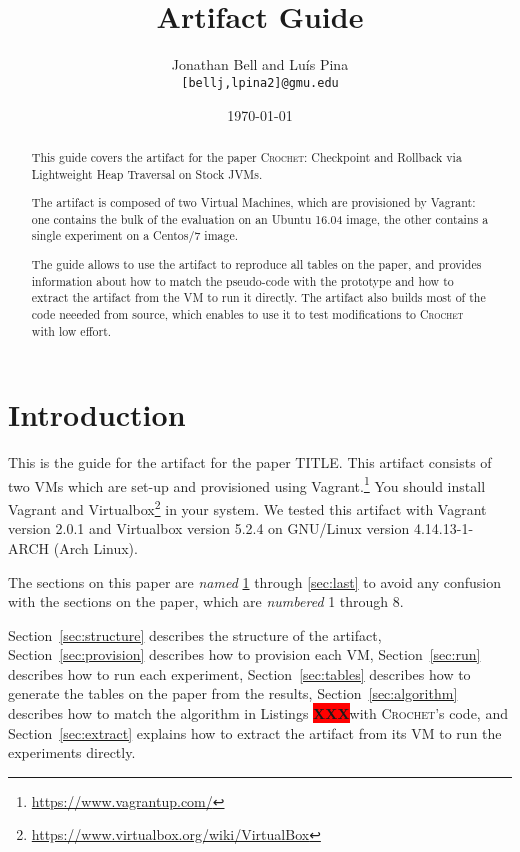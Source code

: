 \documentclass[12pt]{article}
\title{\emph{\papertitle} \\ Artifact Guide}
\author{Jonathan Bell and Lu\'{i}s Pina \\ \texttt{[bellj,lpina2]@gmu.edu}}
\affil{George Mason University}
\date{\today}
\newcommand{\XXX}{\colorbox{red}{\bf\color{white}XXX}}
\newcommand{\sysname}{\textsc{Crochet}\xspace}
\newcommand{\papertitle}{\sysname: Checkpoint and Rollback via Lightweight Heap Traversal on Stock JVMs\xspace}
\begin{document}
\maketitle

\begin{abstract}

    This guide covers the artifact for the paper \papertitle.

    The artifact is composed of two Virtual Machines, which are provisioned by
    Vagrant: one contains the bulk of the evaluation on an Ubuntu 16.04 image,
    the other contains a single experiment on a Centos/7 image.

    The guide allows to use the artifact to reproduce all tables on the paper,
    and provides information about how to match the pseudo-code with the
    prototype and how to extract the artifact from the VM to run it directly.
    The artifact also builds most of the code neeeded from source, which enables
    to use it to test modifications to \sysname with low effort.

\end{abstract}

\section{Introduction}
\label{sec:first}

This is the guide for the artifact for the paper TITLE.  This artifact consists
of two VMs which are set-up and provisioned using
Vagrant.\footnote{\url{https://www.vagrantup.com/}}  You should install Vagrant
and Virtualbox\footnote{\url{https://www.virtualbox.org/wiki/VirtualBox}} in
your system.  We tested this artifact with Vagrant version 2.0.1 and Virtualbox
version 5.2.4 on GNU/Linux version 4.14.13-1-ARCH (Arch Linux).

The sections on this paper are \emph{named} \ref{sec:first} through
\ref{sec:last} to avoid any confusion with the sections on the paper, which are
\emph{numbered} 1 through 8.

Section~\ref{sec:structure} describes the structure of the artifact,
Section~\ref{sec:provision} describes how to provision each VM,
Section~\ref{sec:run} describes how to run each experiment,
Section~\ref{sec:tables} describes how to generate the tables on the paper from
the results, Section~\ref{sec:algorithm} describes how to match the algorithm in
Listings \XXX with \sysname's code, and Section~\ref{sec:extract} explains how to
extract the artifact from its VM to run the experiments directly.
\end{document}
